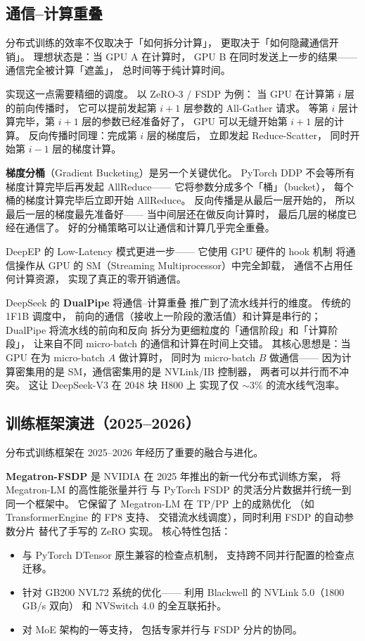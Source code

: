 \subsection{通信--计算重叠}

分布式训练的效率不仅取决于「如何拆分计算」，
更取决于「如何隐藏通信开销」。
理想状态是：当 GPU A 在计算时，
GPU B 在同时发送上一步的结果——
通信完全被计算「遮盖」，
总时间等于纯计算时间。

实现这一点需要精细的调度。
以 ZeRO-3 / FSDP 为例：
当 GPU 在计算第 $i$ 层的前向传播时，
它可以提前发起第 $i+1$ 层参数的 All-Gather 请求。
等第 $i$ 层计算完毕，第 $i+1$ 层的参数已经准备好了，
GPU 可以无缝开始第 $i+1$ 层的计算。
反向传播时同理：完成第 $i$ 层的梯度后，
立即发起 Reduce-Scatter，
同时开始第 $i-1$ 层的梯度计算。

\textbf{梯度分桶}（Gradient Bucketing）是另一个关键优化。
PyTorch DDP 不会等所有梯度计算完毕后再发起 AllReduce——
它将参数分成多个「桶」（bucket），
每个桶的梯度计算完毕后立即开始 AllReduce。
反向传播是从最后一层开始的，
所以最后一层的梯度最先准备好——
当中间层还在做反向计算时，
最后几层的梯度已经在通信了。
好的分桶策略可以让通信和计算几乎完全重叠。

DeepEP 的 Low-Latency 模式更进一步——
它使用 GPU 硬件的 hook 机制
将通信操作从 GPU 的 SM（Streaming Multiprocessor）中完全卸载，
通信不占用任何计算资源，
实现了真正的零开销通信。

DeepSeek 的 \textbf{DualPipe} 将通信--计算重叠
推广到了流水线并行的维度。
传统的 1F1B 调度中，
前向的通信（接收上一阶段的激活值）和计算是串行的；
DualPipe 将流水线的前向和反向
拆分为更细粒度的「通信阶段」和「计算阶段」，
让来自不同 micro-batch 的通信和计算在时间上交错。
其核心思想是：当 GPU 在为 micro-batch $A$ 做计算时，
同时为 micro-batch $B$ 做通信——
因为计算密集用的是 SM，通信密集用的是 NVLink/IB 控制器，
两者可以并行而不冲突。
这让 DeepSeek-V3 在 2048 块 H800 上
实现了仅 $\sim$3\% 的流水线气泡率。

\subsection{训练框架演进（2025--2026）}

分布式训练框架在 2025--2026 年经历了重要的融合与进化。

\textbf{Megatron-FSDP}
是 NVIDIA 在 2025 年推出的新一代分布式训练方案，%
将 Megatron-LM 的高性能张量并行
与 PyTorch FSDP 的灵活分片数据并行统一到同一个框架中。
它保留了 Megatron-LM 在 TP/PP 上的成熟优化
（如 TransformerEngine 的 FP8 支持、
交错流水线调度），同时利用 FSDP 的自动参数分片
替代了手写的 ZeRO 实现。
核心特性包括：
\begin{itemize}[noitemsep]
  \item 与 PyTorch DTensor 原生兼容的检查点机制，
        支持跨不同并行配置的检查点迁移。
  \item 针对 GB200 NVL72 系统的优化——
        利用 Blackwell 的 NVLink 5.0（1800\,GB/s 双向）
        和 NVSwitch 4.0 的全互联拓扑。
  \item 对 MoE 架构的一等支持，
        包括专家并行与 FSDP 分片的协同。
\end{itemize}

